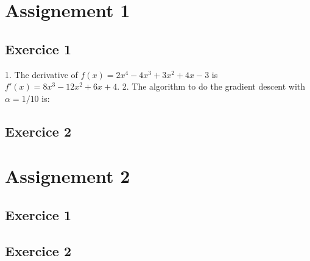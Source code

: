 \documentclass[11pt]{article}
\begin{document}
    \section{Assignement 1}

    \subsection{Exercice 1}
    1. The derivative of $f(x) = 2x^4 - 4x^3 + 3x^2 + 4x - 3$ is $f'(x) = 8x^3 - 12x^2 + 6x + 4$.
    2. The algorithm to do the gradient descent with $\alpha = 1/10$ is:

    \subsection{Exercice 2}


    \section{Assignement 2}

    \subsection{Exercice 1}

    \subsection{Exercice 2}
\end{document}
